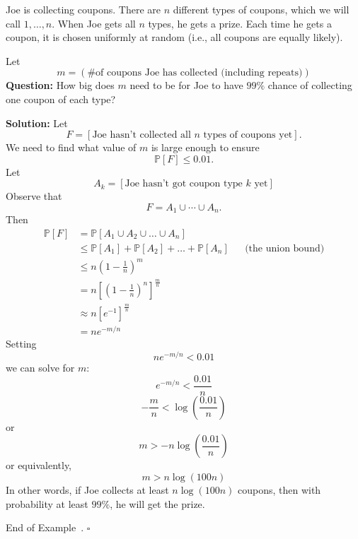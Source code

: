 \documentclass[10pt]{article}
\theoremstyle{definition}
\newtheorem{example}[theorem]{Example}
\renewenvironment{example}
{\begin{oldexample}}
  {\par\smallskip\hfill   End of Example~\theexample. $\square$    \par\end{oldexample}}
\newcommand{\fl}{\noindent\textbf} %
\newcommand{\1}[1]{\textbf{1}_{\left[#1\right]}} %
\def\P{\mathbb{P}} %
\begin{document}
\begin{example}
  Joe is collecting coupons. There are $n$ different types of coupons, which
  we will call $1,\ldots,n$. When Joe gets all $n$ types, he gets a prize.
  Each time he gets a coupon, it is chosen uniformly at random (i.e., all
  coupons are equally likely).

  Let
  \begin{equation*}
    m = (\text{\# of coupons Joe has collected (including repeats)})
  \end{equation*}
  \fl{Question:} How big does $m$ need to be for Joe to have $99\%$ chance of
  collecting one coupon of each type?

  \fl{Solution:} Let
  \begin{equation*}
    F = [\text{Joe hasn't collected all $n$ types of coupons yet}].
  \end{equation*}
  We need to find  what value of $m$ is large enough to ensure
  \begin{equation*}
    \P\left[F \right] \leq 0.01.
  \end{equation*}
  Let 
  \begin{equation*}
    A_{k} = [\text{Joe hasn't got coupon type $k$ yet}]
  \end{equation*}
  Observe that
  \begin{equation*}
    F = A_{1}\cup\cdots\cup A_{n}.
  \end{equation*}
  Then
  \begin{align*}
    \P\left[F \right] 
    &= \P\left[A_{1}\cup A_{2}\cup \ldots \cup A_{n} \right]\\
    &\leq \P\left[A_{1} \right]+ \P\left[A_{2} \right]+\ldots+\P\left[A_{n}
      \right] &&\text{(the union bound)}\\
    &\leq n \left( 1-\frac{1}{n} \right)^{m}\\ 
    &= n \left[ \left( 1-\frac{1}{n} \right)^{n}  \right]^{\frac{m}{n}}\\
    &\approx n \left[ e^{-1} \right]^{\frac{m}{n}}\\ 
    &= ne^{-m/n}
  \end{align*}
  Setting
  \begin{equation*}
    ne^{-m/n}<0.01
  \end{equation*}
  we can solve for $m$:
  \begin{equation*}
    e^{-m/n}< \frac{0.01}{n}
  \end{equation*}
  \begin{equation*}
    -\frac{m}{n} < \log \left( \frac{0.01}{n} \right) 
  \end{equation*}
  or
  \begin{equation*}
    m > - n\log\left(\frac{0.01}{n} \right) 
  \end{equation*}
  or equivalently,
  \begin{equation*}
    m > n \log\left(100n \right) 
  \end{equation*}
  In other words, if Joe collects at least $n \log\left(100n \right)$ coupons,
  then with probability at least $99\%$, he will get the prize.


\end{example}
\end{document}
